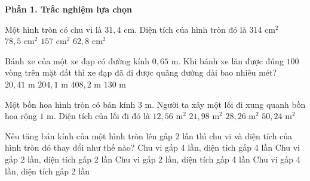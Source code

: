 \textbf{Phần 1. Trắc nghiệm lựa chọn}

\begin{ex} %
Một hình tròn có chu vi là $31{,}4\text{ cm}$. Diện tích của hình tròn đó là
\choice
{$314\text{ cm}^2$}
{\True $78{,}5\text{ cm}^2$}
{$157\text{ cm}^2$}
{$62{,}8\text{ cm}^2$}
\end{ex}

\begin{ex} %
Bánh xe của một xe đạp có đường kính $0{,}65\text{ m}$. Khi bánh xe lăn được đúng $100$ vòng trên mặt đất thì xe đạp đã đi được quãng đường dài bao nhiêu mét?
\choice
{$20{,}41\text{ m}$}
{\True $204{,}1\text{ m}$}
{$408{,}2\text{ m}$}
{$130\text{ m}$}
\end{ex}

\begin{ex} %
Một bồn hoa hình tròn có bán kính $3\text{ m}$. Người ta xây một lối đi xung quanh bồn hoa rộng $1\text{ m}$. Diện tích của lối đi đó là
\choice
{$12{,}56\text{ m}^2$}
{\True $21{,}98\text{ m}^2$}
{$28{,}26\text{ m}^2$}
{$50{,}24\text{ m}^2$}
\end{ex}

\begin{ex} %
Nếu tăng bán kính của một hình tròn lên gấp 2 lần thì chu vi và diện tích của hình tròn đó thay đổi như thế nào?
\choice
{Chu vi gấp 4 lần, diện tích gấp 4 lần}
{Chu vi gấp 2 lần, diện tích gấp 2 lần}
{\True Chu vi gấp 2 lần, diện tích gấp 4 lần}
{Chu vi gấp 4 lần, diện tích gấp 2 lần}
\end{ex}

